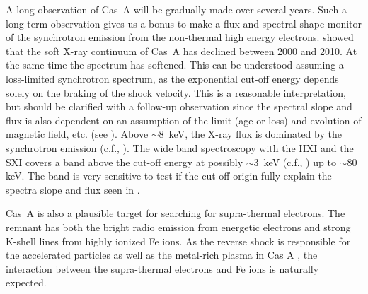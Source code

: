 \documentclass[11pt,a4paper]{article}
\begin{document}
{A long observation of Cas~A will be gradually made over several
years. Such a long-term observation gives us a bonus to make a flux
and spectral shape monitor of the synchrotron emission from the
non-thermal high energy electrons. \citet{Patnaude11} showed that the
soft X-ray continuum of Cas~A has declined between 2000 and 2010. At
the same time the spectrum has softened. This can be understood
assuming a loss-limited synchrotron spectrum, as the exponential
cut-off energy depends solely on the braking of the shock velocity. This
is a reasonable interpretation, but should be clarified with a
follow-up observation since the spectral slope and flux is also
dependent on an assumption of the limit (age or loss) and evolution of
magnetic field, etc. (see \citealt{Vink12}). Above $\sim$8~keV, the
X-ray flux is dominated by the synchrotron emission (c.f.,
\citealt{Maeda09}). The wide band spectroscopy with
the HXI and the SXI covers a band above the cut-off energy at possibly
$\sim$3~keV (c.f., \citealt{Maeda09}) up to $\sim$80 keV\@. 
The band is very sensitive to test if the cut-off origin fully explain 
the spectra slope and flux seen in \chandra.

Cas~A is also a plausible target for searching for supra-thermal
electrons.  The remnant has both the bright radio emission from
energetic electrons and strong K-shell lines from highly ionized Fe
ions.  As the reverse shock is responsible for the accelerated
particles as well as the metal-rich plasma in Cas A
\citep{Helder08}, the interaction between the supra-thermal
electrons and Fe ions is naturally expected.

}
\end{document}
